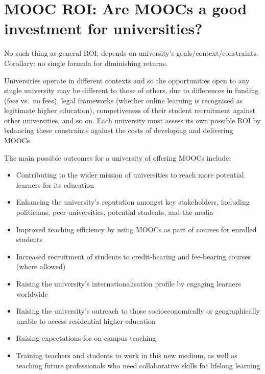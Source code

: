 \section{MOOC ROI: Are MOOCs a good investment for universities?}


No such thing as general ROI; depends on university's
goals/context/constraints. Corollary: no single formula for diminishing
returns.  
 
Universities operate in different contexts and so the opportunities open
to any single university may be different to those of others, due to
differences in funding (fees vs.\ no fees), legal frameworks (whether online
learning is recognised as legitimate higher education), competiveness of their
student recruitment against other universities, and so on.  Each
university must assess its own possible ROI by balancing these constraints
against the costs of developing and delivering MOOCs.
 
The main possible outcomes for a university of offering MOOCs include:

\begin{itemize}

\item Contributing to the wider mission of universities to reach more
potential learners for its education
\item  Enhancing the university's
reputation amongst key stakeholders, including politicians, peer
universities, potential students, and the media 
\item Improved teaching efficiency  by using MOOCs as part of courses
  for enrolled students 
\item Increased recruitment of students to credit-bearing and
  fee-bearing courses (where allowed)
\item Raising the university's
internationalisation profile  by engaging learners
worldwide
\item  Raising the university's outreach to those socioeconomically or
  geographically unable to
access residential higher education
\item Raising expectations for
on-campus teaching
\item Training teachers and
students to work  in this new medium, as well as teaching future
professionals who need collaborative skills for lifelong learning 

\end{itemize}


